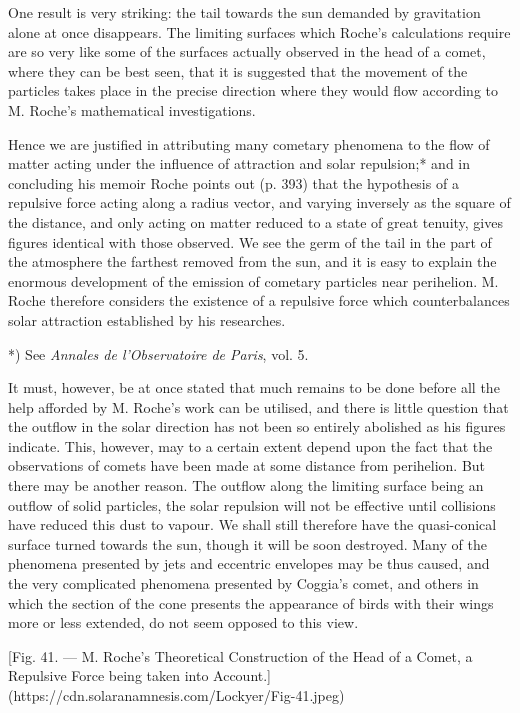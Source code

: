 \documentclass[a4paper, 12pt, oneside, polutonikogreek, english]{article}
\begin{document}
One result is very striking: the tail towards the sun demanded by gravitation alone at once disappears. The limiting surfaces which Roche's calculations require are so very like some of the surfaces actually observed in the head of a comet, where they can be best seen, that it is suggested that the movement of the particles takes place in the precise direction where they would flow according to M. Roche's mathematical investigations.

Hence we are justified in attributing many cometary phenomena to the flow of matter acting under the influence of attraction and solar repulsion;* and in concluding his memoir Roche points out (p. 393) that the hypothesis of a repulsive force acting along a radius vector, and varying inversely as the square of the distance, and only acting on matter reduced to a state of great tenuity, gives figures identical with those observed. We see the germ of the tail in the part of the atmosphere the farthest removed from the sun, and it is easy to explain the enormous development of the emission of cometary particles near perihelion. M. Roche therefore considers the existence of a repulsive force which counterbalances solar attraction established by his researches.

*) See \emph{Annales de l'Observatoire de Paris}, vol. 5.

It must, however, be at once stated that much remains to be done before all the help afforded by M. Roche's work can be utilised, and there is little question that the outflow in the solar direction has not been so entirely abolished as his figures indicate. This, however, may to a certain extent depend upon the fact that the observations of comets have been made at some distance from perihelion. But there may be another reason. The outflow along the limiting surface being an outflow of solid particles, the solar repulsion will not be effective until collisions have reduced this dust to vapour. We shall still therefore have the quasi-conical surface turned towards the sun, though it will be soon destroyed. Many of the phenomena presented by jets and eccentric envelopes may be thus caused, and the very complicated phenomena presented by Coggia's comet, and others in which the section of the cone presents the appearance of birds with their wings more or less extended, do not seem opposed to this view.

[Fig. 41. --- M. Roche's Theoretical Construction of the Head of a Comet, a Repulsive Force being taken into Account.](https://cdn.solaranamnesis.com/Lockyer/Fig-41.jpeg)
\end{document}

